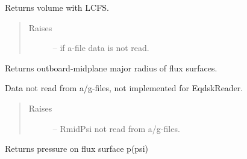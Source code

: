 \documentclass[letterpaper,10pt,english]{sphinxmanual}
\begin{document}
\begin{fulllineitems}
\begin{fulllineitems}
\end{fulllineitems}


\begin{fulllineitems}
\label{eqtools:eqtools.eqdskreader.EqdskReader.getFluxVol}
\end{fulllineitems}


\begin{fulllineitems}
\label{eqtools:eqtools.eqdskreader.EqdskReader.getVolLCFS}
Returns volume with LCFS.
\begin{quote}\begin{description}
\item[{Raises }] \leavevmode
{} -- 
if a-file data is not read.

\end{description}\end{quote}

\end{fulllineitems}


\begin{fulllineitems}
\label{eqtools:eqtools.eqdskreader.EqdskReader.getRmidPsi}
Returns outboard-midplane major radius of flux surfaces.

Data not read from a/g-files, not implemented for EqdskReader.
\begin{quote}\begin{description}
\item[{Raises }] \leavevmode
{} -- 
RmidPsi not read from a/g-files.

\end{description}\end{quote}

\end{fulllineitems}


\begin{fulllineitems}
\label{eqtools:eqtools.eqdskreader.EqdskReader.getFluxPres}
Returns pressure on flux surface p(psi)


\end{fulllineitems}
\end{fulllineitems}
\end{document}

